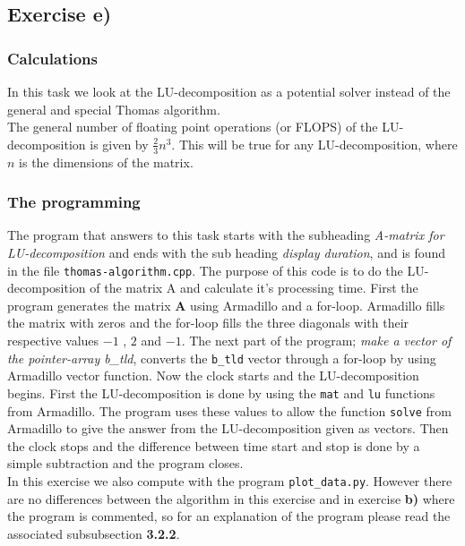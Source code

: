 \documentclass{article}
\begin{document}
\subsection{Exercise e)} \label{Method e)}


  \subsubsection{Calculations}

    In this task we look at the LU-decomposition as a potential solver instead of the general and special Thomas algorithm. \\

    The general number of floating point operations (or FLOPS) of the LU-decomposition is given by $ \frac{2}{3} n^3$. This will be true for any LU-decomposition, where $n$ is the dimensions of the matrix.


  \subsubsection{The programming}


    The program that answers to this task starts with the subheading \textit{A-matrix for LU-decomposition} and ends with the sub heading \textit{display duration}, and is found in the file \texttt{thomas-algorithm.cpp}. The purpose of this code is to do the LU-decomposition of the matrix A and calculate it's processing time. First the program generates the matrix \textbf{A} using Armadillo and a for-loop. Armadillo fills the matrix with zeros and the for-loop fills the three diagonals with their respective values $-1$ , $2$ and $ -1$. The next part of the program; \textit{make a vector of the pointer-array b\_tld}, converts the \texttt{b\_tld} vector through a for-loop by using Armadillo vector function. Now the clock starts and the LU-decomposition begins. First the LU-decomposition is done by using the \texttt{mat} and \texttt{lu} functions from Armadillo. The program uses these values to allow the function \texttt{solve} from Armadillo to give the answer from the LU-decomposition given as vectors. Then the clock stops and the difference between time start and stop is done by a simple subtraction and the program closes. \\

    In this exercise we also compute with the program \texttt{plot\_data.py}. However there are no differences between the algorithm in this exercise and in exercise \textbf{b)} where the program is commented, so for an explanation of the program please read the associated subsubsection \textbf{3.2.2}.
\end{document}

